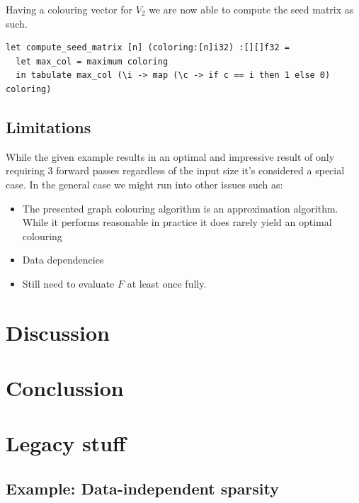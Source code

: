 Having a colouring vector for $V_2$ we are now able to compute the 
seed matrix as such. 
\begin{listing}[H]
\begin{verbatim}
let compute_seed_matrix [n] (coloring:[n]i32) :[][]f32 =
  let max_col = maximum coloring
  in tabulate max_col (\i -> map (\c -> if c == i then 1 else 0) coloring)
\end{verbatim}
\end{listing}

\subsection{Limitations}
While the given example results in an optimal and impressive result of 
only requiring 3 forward passes regardless of the input size 
it's considered a special case. In the general case we might 
run into other issues such as:
\begin{itemize}
	\item The presented graph colouring algorithm is an approximation algorithm. 
	While it performs reasonable in practice it does rarely yield an optimal colouring
	\item Data dependencies
	\item Still need to evaluate $F$ at least once fully. 
\end{itemize}


\section{Discussion}




\section{Conclussion}




















\newpage 
\newpage 


\section{Legacy stuff}
\subsection{Example: Data-independent sparsity}

